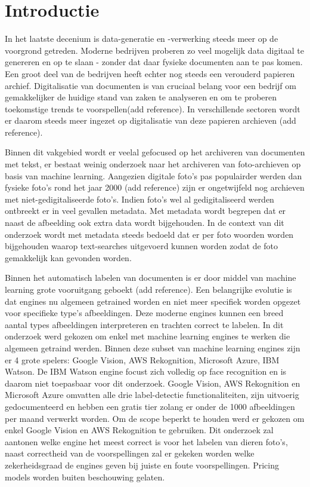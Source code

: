 
\section{Introductie} %
\label{sec:introductie}
In het laatste decenium is data-generatie en -verwerking steeds meer op de voorgrond getreden. Moderne bedrijven proberen zo veel mogelijk data digitaal te genereren en op te slaan - zonder dat daar fysieke documenten aan te pas komen. Een groot deel van de bedrijven heeft echter nog steeds een verouderd papieren archief.
Digitalisatie van documenten is van cruciaal belang voor een bedrijf om gemakkelijker de huidige stand van zaken te analyseren en om te proberen toekomstige trends te voorspellen(add reference). In verschillende sectoren wordt er daarom steeds meer ingezet op digitalisatie van deze papieren archieven (add reference). 

Binnen dit vakgebied wordt er veelal gefocused op het archiveren van documenten met tekst, er bestaat weinig onderzoek naar het archiveren van foto-archieven op basis van machine learning. Aangezien digitale foto's pas populairder werden dan fysieke foto's rond het jaar 2000 (add reference) zijn er ongetwijfeld nog archieven met niet-gedigitaliseerde foto's. Indien foto's wel al gedigitaliseerd werden ontbreekt er in veel gevallen metadata. Met metadata wordt begrepen dat er naast de afbeelding ook extra data wordt bijgehouden. In de context van dit onderzoek wordt met metadata steeds bedoeld dat er per foto woorden worden bijgehouden waarop text-searches uitgevoerd kunnen worden zodat de foto gemakkelijk kan gevonden worden.

Binnen het automatisch labelen van documenten is er door middel van machine learning grote vooruitgang geboekt (add reference). Een belangrijke evolutie is dat engines nu algemeen getrained worden en niet meer specifiek worden opgezet voor specifieke type's afbeeldingen. Deze moderne engines kunnen een breed aantal types afbeeldingen interpreteren en trachten correct te labelen. In dit onderzoek werd gekozen om enkel met machine learning engines te werken die algemeen getraind werden. Binnen deze subset van machine learning engines zijn er 4 grote spelers: Google Vision, AWS Rekognition, Microsoft Azure, IBM Watson. De IBM Watson engine focust zich volledig op face recognition en is daarom niet toepasbaar voor dit onderzoek. Google Vision, AWS Rekognition en Microsoft Azure omvatten alle drie label-detectie functionaliteiten, zijn uitvoerig gedocumenteerd en hebben een gratis tier zolang er onder de 1000 afbeeldingen per maand verwerkt worden. Om de scope beperkt te houden werd er gekozen om enkel Google Vision en AWS Rekognition te gebruiken.
Dit onderzoek zal aantonen welke engine het meest correct is voor het labelen van dieren foto's, naast correctheid van de voorspellingen zal er gekeken worden welke zekerheidsgraad de engines geven bij juiste en foute voorspellingen. Pricing models worden buiten beschouwing gelaten.

